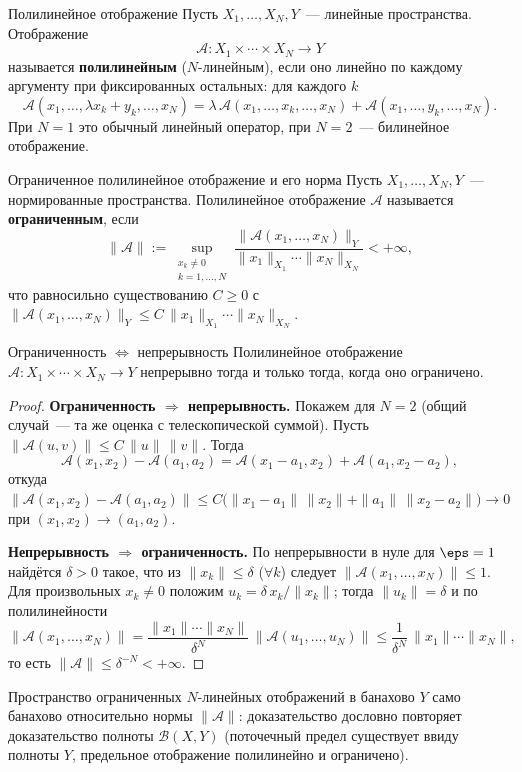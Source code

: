 \begin{Definition}{Полилинейное отображение}{}
	Пусть $X_1, \ldots, X_N, Y$~--- линейные пространства. Отображение
	\[
	\mathcal{A}\colon X_1 \times \cdots \times X_N \to Y
	\]
	называется \textbf{полилинейным} ($N$-линейным), если оно линейно по каждому аргументу при фиксированных остальных: для каждого $k$
	\[
	\mathcal{A}(x_1, \ldots, \lambda x_k + y_k, \ldots, x_N) = \lambda\,\mathcal{A}(x_1, \ldots, x_k, \ldots, x_N) + \mathcal{A}(x_1, \ldots, y_k, \ldots, x_N).
	\]
	При $N = 1$ это обычный линейный оператор, при $N = 2$~--- билинейное отображение.
\end{Definition}

\begin{Definition}{Ограниченное полилинейное отображение и его норма}{}
	Пусть $X_1, \ldots, X_N, Y$~--- нормированные пространства. Полилинейное отображение $\mathcal{A}$ называется \textbf{ограниченным}, если
	\[
	\|\mathcal{A}\| := \sup_{\substack{x_k \neq 0 \\ k = 1, \ldots, N}} \frac{\|\mathcal{A}(x_1, \ldots, x_N)\|_Y}{\|x_1\|_{X_1} \cdots \|x_N\|_{X_N}} < +\infty,
	\]
	что равносильно существованию $C \ge 0$ с $\|\mathcal{A}(x_1, \ldots, x_N)\|_Y \le C\,\|x_1\|_{X_1}\cdots\|x_N\|_{X_N}$. %
\end{Definition}

\begin{Statement}{Ограниченность $\Leftrightarrow$ непрерывность}{}
	Полилинейное отображение $\mathcal{A}\colon X_1 \times \cdots \times X_N \to Y$ непрерывно тогда и только тогда, когда оно ограничено. %
\end{Statement}

\begin{proof}
	\textbf{Ограниченность $\Rightarrow$ непрерывность.} Покажем для $N = 2$ (общий случай~--- та же оценка с телескопической суммой). Пусть $\|\mathcal{A}(u, v)\| \le C\,\|u\|\,\|v\|$. Тогда
	\[
	\mathcal{A}(x_1, x_2) - \mathcal{A}(a_1, a_2) = \mathcal{A}(x_1 - a_1, x_2) + \mathcal{A}(a_1, x_2 - a_2),
	\]
	откуда $\|\mathcal{A}(x_1, x_2) - \mathcal{A}(a_1, a_2)\| \le C\bigl(\|x_1 - a_1\|\,\|x_2\| + \|a_1\|\,\|x_2 - a_2\|\bigr) \to 0$ при $(x_1, x_2) \to (a_1, a_2)$.

	\textbf{Непрерывность $\Rightarrow$ ограниченность.} По непрерывности в нуле для $\eps = 1$ найдётся $\delta > 0$ такое, что из $\|x_k\| \le \delta$ ($\forall k$) следует $\|\mathcal{A}(x_1, \ldots, x_N)\| \le 1$. Для произвольных $x_k \neq 0$ положим $u_k = \delta\,x_k/\|x_k\|$; тогда $\|u_k\| = \delta$ и по полилинейности
	\[
	\|\mathcal{A}(x_1, \ldots, x_N)\| = \frac{\|x_1\|\cdots\|x_N\|}{\delta^N}\,\|\mathcal{A}(u_1, \ldots, u_N)\| \le \frac{1}{\delta^N}\,\|x_1\|\cdots\|x_N\|,
	\]
	то есть $\|\mathcal{A}\| \le \delta^{-N} < +\infty$.
\end{proof}

\begin{Remark}{}{}
	Пространство ограниченных $N$-линейных отображений в банахово $Y$ само банахово относительно нормы $\|\mathcal{A}\|$: доказательство дословно повторяет доказательство полноты $\mathcal{B}(X, Y)$ (поточечный предел существует ввиду полноты $Y$, предельное отображение полилинейно и ограничено). %
\end{Remark}
